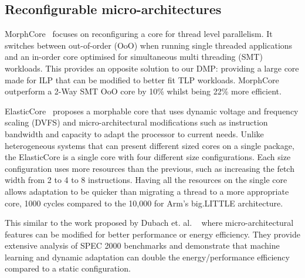 \vspace{-1em}
\subsection{Reconfigurable micro-architectures}

MorphCore~\cite{khubaibMorphCore2012} focuses on reconfiguring a core for thread level parallelism.
It switches between out-of-order (OoO) when running single threaded applications and an in-order core optimised for simultaneous multi threading (SMT) workloads.
This provides an opposite solution to our DMP: providing a large core made for ILP that can be modified to better fit TLP workloads.
MorphCore outperform a 2-Way SMT OoO core by 10\% whilst being 22\% more efficient.

ElasticCore~\cite{tavanaElastic} proposes a morphable core that uses dynamic voltage and frequency scaling (DVFS) and micro-architectural modifications such as instruction bandwidth and capacity to adapt the processor to current needs.
Unlike heterogeneous systems that can present different sized cores on a single package, the ElasticCore is a single core with four different size configurations.
Each size configuration uses more resources than the previous, such as increasing the fetch width from 2 to 4 to 8 instructions.
Having all the resources on the single core allows adaptation to be quicker than migrating a thread to a  more appropriate core, 1000 cycles compared to the 10,000 for Arm's big.LITTLE architecture.

This similar to the work proposed by Dubach et. al. ~\cite{dubach13dynamic} where micro-architectural features can be modified for better performance or energy efficiency.
They provide extensive analysis of SPEC 2000 benchmarks and demonstrate that machine learning and dynamic adaptation can double the energy/performance efficiency compared to a static configuration.

